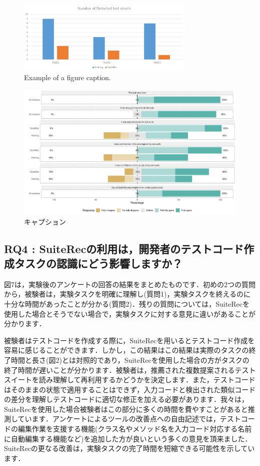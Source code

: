 \documentclass[conference]{IEEEtran}
\begin{document}
\begin{figure}[htbp]
\centerline{\includegraphics[width=8.5cm]{testsmell.pdf}}
\caption{Example of a figure caption.}
\label{fig}
\end{figure}

\begin{figure}[t]
 \begin{center}
  \includegraphics[width=18.5cm]{SuiteRec_qa_result.pdf}
  \caption{キャプション}
  \label{}
 \end{center}
\end{figure}

\subsection{RQ4 : SuiteRecの利用は，開発者のテストコード作成タスクの認識にどう影響しますか？}


図7は，実験後のアンケートの回答の結果をまとめたものです．初めの2つの質問から，被験者は，実験タスクを明確に理解し(質問1)，実験タスクを終えるのに十分な時間があったことが分かる(質問2)．残りの質問については，SuiteRecを使用した場合とそうでない場合で，実験タスクに対する意見に違いがあることが分かります．

被験者はテストコードを作成する際に，SuiteRecを用いるとテストコード作成を容易に感じることができます．しかし，この結果はこの結果は実際のタスクの終了時間と長さ(図2)とは対照的であり，SuiteRecを使用した場合の方がタスクの終了時間が遅いことが分かります．被験者は，推薦された複数提案されるテストスイートを読み理解して再利用するかどうかを決定します．また，テストコードはそのままの状態で適用することはできず，入力コードと検出された類似コードの差分を理解しテストコードに適切な修正を加える必要があります．我々は，SuiteRecを使用した場合被験者はこの部分に多くの時間を費やすことがあると推測しています．アンケートによるツールの改善点への自由記述では，テストコードの編集作業を支援する機能(クラス名やメソッド名を入力コード対応する名前に自動編集する機能など)を追加した方が良いという多くの意見を頂来ました．SuiteRecの更なる改善は，実験タスクの完了時間を短縮できる可能性を示しています．
\end{document}
